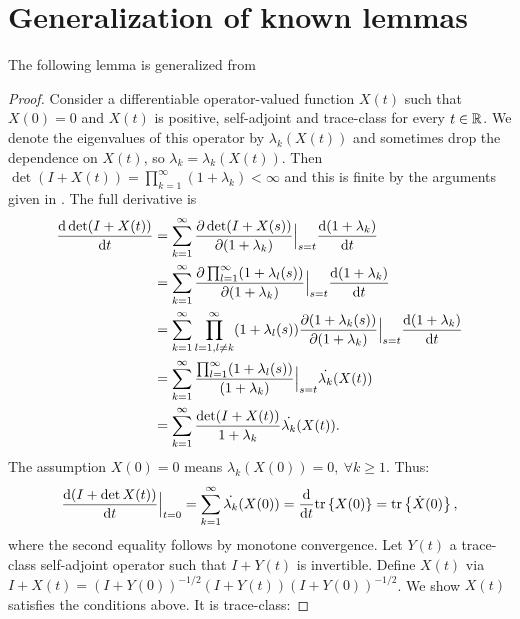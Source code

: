 \appendix
\section{Generalization of known lemmas}

The following lemma is generalized from \cite[Chapter 9, Theorem 4, p. 127]{Lax07}
\lax
\begin{proof}
  Consider a differentiable operator-valued function $X(t)$ such that
  $X(0) = 0$ and $X(t)$ is positive, self-adjoint and trace-class for
  every $t\in \mathbb{R}$. We denote the eigenvalues of this operator by
  $\lambda_k(X(t))$ and sometimes drop the dependence on $X(t)$, so
  $\lambda_k = \lambda_k(X(t))$.  Then $\det (I+X(t))
  = \prod_{k=1}^{\infty} (1+\lambda_k) < \infty$ and this is finite by
  the arguments given in \cite{AlexanderianGloorGhattas14}. The full
  derivative is \begin{align*} \frac{\text{\textup{d}} \det (I+X(t))}{\text{\textup{d}} t}
    &= \sum_{k=1}^{\infty} 
    \frac{\partial \det (I+X(s))}{\partial (1+\lambda_k)}\Big |_{s=t}
    \frac{\text{\textup{d}} (1+\lambda_k)}{\text{\textup{d}} t} \\
    &= \sum_{k=1}^{\infty} \frac{\partial \prod_{l=1}^{\infty}
      (1+\lambda_l(s))}{\partial (1+\lambda_k)}\Big |_{s=t}
    \frac{\text{\textup{d}} (1+\lambda_k)}{\text{\textup{d}} t} \\
    &= \sum_{k=1}^{\infty} \prod_{l=1, l\neq k}^{\infty}
      (1+\lambda_l(s)) \frac{\partial (1+\lambda_k(s))}{\partial (1+\lambda_k)}\Big |_{s=t}
    \frac{\text{\textup{d}} (1+\lambda_k)}{\text{\textup{d}} t} \\
    &= \sum_{k=1}^{\infty} \frac{\prod_{l=1}^{\infty}
      (1+\lambda_l(s))}{(1+\lambda_k)}\Big |_{s=t}
    \dot{\lambda_k}(X(t)) \\
    &= \sum_{k=1}^{\infty} \frac{\det (I+X(t))}{1 +\lambda_k} \dot{\lambda_k}(X(t)).
  \end{align*}
  The assumption $X(0) = 0$ means $\lambda_k(X(0)) = 0,\ \forall k \geq 1$. Thus:
  \begin{align*}
    \frac{\text{\textup{d}} (I+\det X(t))}{\text{\textup{d}} t}\Big |_{t=0} 
    = \sum_{k=1}^{\infty} \dot{\lambda_k}(X(0)) 
    = \frac{\text{\textup{d}} }{\text{\textup{d}} t}\textup{tr}\left \{X(0) \right \}
    = \textup{tr}\left \{\dot{X}(0) \right \},
  \end{align*}
  where the second equality follows by monotone convergence. 
  Let $Y(t)$ a trace-class self-adjoint operator such that 
  $I+Y(t)$ is invertible.
  Define $X(t)$ via $I+X(t) = (I+Y(0))^{-1/2} (I+Y(t)) (I+Y(0))^{-1/2}$. 
  We show $X(t)$ satisfies the conditions above. It is trace-class:

\end{proof}
